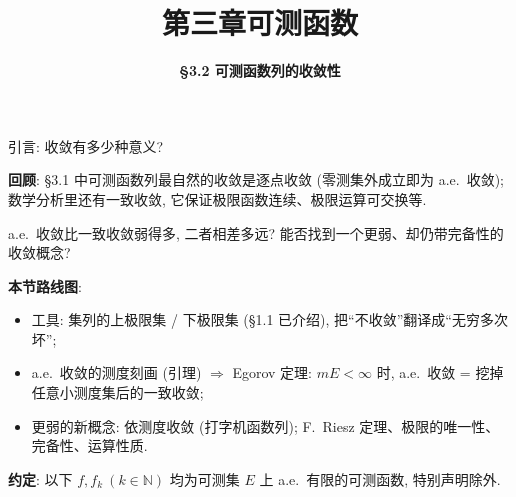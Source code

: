 \everymath{\displaystyle}



\title[第三章\\
可测函数]{\texorpdfstring{\LARGE \bfseries 第三章\quad 可测函数}{第三章 可测函数}}
\author[\S 3.2\\
可测函数列的收敛性]
{\Large \bfseries \S 3.2 可测函数列的收敛性}
\date{}





\begin{frame}

\titlepage

\end{frame}




\begin{frame}{引言: 收敛有多少种意义?}

\textbf{回顾}: \S 3.1 中可测函数列最自然的收敛是\alert{逐点收敛} (零测集外成立即为 a.e.\ 收敛); 数学分析里还有\alert{一致收敛}, 它保证极限函数连续、极限运算可交换等.

\pause

\begin{question}
a.e.\ 收敛比一致收敛弱得多, 二者相差多远? 能否找到一个\alert{更弱}、却仍带\alert{完备性}的收敛概念?
\end{question}

\pause

\textbf{本节路线图}:
\begin{itemize}
\item 工具: 集列的上极限集 / 下极限集 (\S 1.1 已介绍), 把``不收敛''翻译成``无穷多次坏'';
\item a.e.\ 收敛的\alert{测度刻画} (引理) $\Longrightarrow$ \alert{Egorov 定理}: $mE<\infty$ 时, a.e.\ 收敛 = 挖掉任意小测度集后的一致收敛;
\item 更弱的新概念: \alert{依测度收敛} (打字机函数列); F.~Riesz 定理、极限的唯一性、\alert{完备性}、运算性质.
\end{itemize}

\textbf{约定}: 以下 $f, f_k\ (k \in \mathbb{N})$ 均为可测集 $E$ 上 a.e.\ 有限的可测函数, 特别声明除外.

\end{frame}

